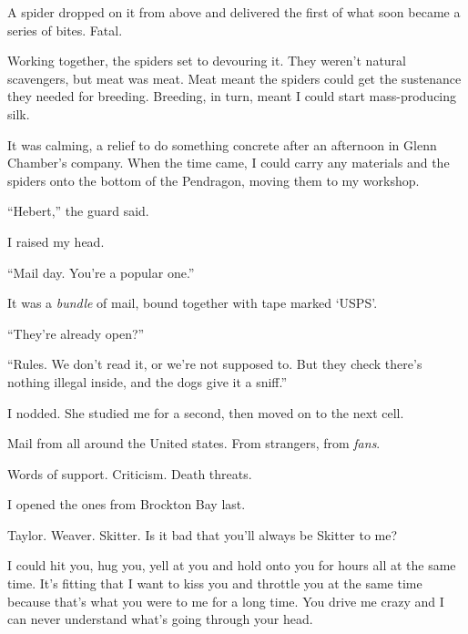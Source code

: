 A spider dropped on it from above and delivered the first of what soon became a series of bites.  Fatal.



Working together, the spiders set to devouring it.  They weren't natural scavengers, but meat was meat.  Meat meant the spiders could get the sustenance they needed for breeding.  Breeding, in turn, meant I could start mass-producing silk.



It was calming, a relief to do something concrete after an afternoon in Glenn Chamber's company.  When the time came, I could carry any materials and the spiders onto the bottom of the Pendragon, moving them to my workshop.



``Hebert,'' the guard said.



I raised my head.



``Mail day.  You're a popular one.''



It was a \emph{bundle} of mail, bound together with tape marked `USPS'.



``They're already open?''



``Rules.  We don't read it, or we're not supposed to.  But they check there's nothing illegal inside, and the dogs give it a sniff.''



I nodded.  She studied me for a second, then moved on to the next cell.



Mail from all around the United states.  From strangers, from \emph{fans}.



Words of support.  Criticism.  Death threats.



I opened the ones from Brockton Bay last.



Taylor.  Weaver.  Skitter.  Is it bad that you'll always be Skitter to me?



I could hit you, hug you, yell at you and hold onto you for hours all at the same time.  It's fitting that I want to kiss you and throttle you at the same time because that's what you were to me for a long time.  You drive me crazy and I can never understand what's going through your head.




